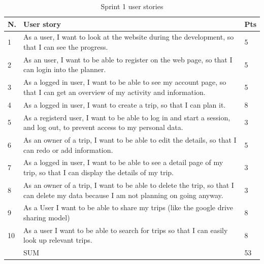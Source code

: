 \documentclass[a4paper]{article}
\begin{document}
\begin{table}
  \begin{tabulary}{1.0\textwidth}{|L|L|L|}
    \hline
    N. & User story & Pts \\ \hline
    
    1&As a user, I want to look at the website during the development, so that I can see the progress.
    & 5 \\ \hline
    
    2&As an user, I want to be able to register on the web page, so that I can login into the planner.
    & 5 \\ \hline

    3&As a logged in user, I want to be able to see my account page, so that I can get an overview of my activity and information.
    & 5 \\ \hline

    4&As a logged in user, I want to create a trip, so that I can plan it. 
    & 8 \\ \hline

    5&As a registerd user, I want to be able to log in and start a session, and log out, to prevent access to my personal data. & 3 \\ \hline

    6&As an owner of a trip, I want to be able to edit the details, so that I can redo or add information. & 5 \\ \hline

    7&As a logged in user, I want to be able to see a detail page of my trip, so that I can display the details of my trip. & 3 \\ \hline

    8&As an owner of a trip, I want to be able to delete the trip, so that I can delete my data because I am not planning on going anyway. & 3 \\ \hline

    9&As a User I want to be able to share my trips (like the google drive sharing model) & 8 \\ \hline

    10&As a user I want to be able to search for trips so that I can easily look up relevant trips. & 8 \\ \hline
    &SUM & 53 \\ \hline
  \end{tabulary}
  \caption{Sprint 1 user stories}
\end{table}
\end{document}
